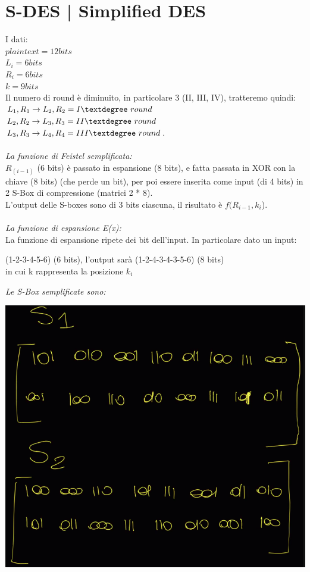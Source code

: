 \documentclass[11pt, oneside]{article}   	%
\begin{document}
\section*{S-DES | Simplified DES}
I dati:\\
\(plaintext = 12 bits \)\\
\(L_i = 6 bits\)\\
\(R_i = 6 bits\)\\
\(k = 9 bits\)\\
Il numero di round è diminuito, in particolare 3 (II, III, IV), tratteremo quindi:\\ \(L_1, R_1  \rightarrow L_2, R_2 = I° $ $  round\)\\ \(L_2, R_2  \rightarrow L_3, R_3 = II°  $ $round\)\\ \(L_3, R_3  \rightarrow L_4, R_4 = III° $ $ round\). \\\\
\emph{La funzione di Feistel semplificata:}\\
\(R_{(i-1)}\) (6 bits) è passato in espansione (8 bits), e fatta passata in XOR con la chiave (8 bits) (che perde un bit), per poi essere inserita come input (di 4 bits) in 2 S-Box di compressione (matrici 2 * 8).\\
L'output delle S-boxes sono di 3 bits ciascuna, il risultato è \(f(R_{i-1}, k_i\)).\\\\
\emph{La funzione di espansione E(x):}\\
La funzione di espansione ripete dei bit dell'input. In particolare dato un input:\begin{center}
(1-2-3-4-5-6) (6 bits), l'output sarà (1-2-4-3-4-3-5-6) (8 bits) \\in cui k rappresenta la posizione \(k_i\)\\
\end{center}
\emph{Le S-Box semplificate sono:}
\begin{center}
\includegraphics[scale= 0.5]{ssbox}\\
\end{center}
\end{document}
